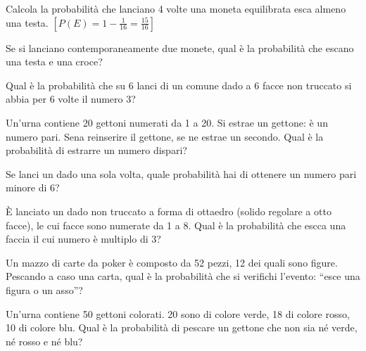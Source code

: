 \begin{esercizio}[\Ast]
 \label{ese:9.46}
Calcola la probabilità che lanciano 4 volte una moneta equilibrata esca almeno 
una testa.
\hfill $\left[P(E)=1-\frac 1{16}=\frac{15}{16}\right]$
\end{esercizio}


\begin{esercizio}%
Se si lanciano contemporaneamente due monete, qual è la probabilità che escano 
una testa e una croce?
\end{esercizio}

\begin{esercizio} %
Qual è la probabilità che su 6 lanci di un comune dado a 6 facce non truccato si 
abbia per 6 volte il numero 3?
\end{esercizio}

\begin{esercizio} %
Un'urna contiene 20 gettoni numerati da 1 a 20. Si estrae un gettone: è un 
numero pari. Sena reinserire il gettone, se ne estrae un secondo. Qual è la 
probabilità di estrarre un numero dispari?
\end{esercizio}

\begin{esercizio} %
Se lanci un dado una sola volta, quale probabilità hai di ottenere un numero 
pari minore di 6?
\end{esercizio}

\begin{esercizio} %
È lanciato un dado non truccato a forma di ottaedro (solido regolare a otto 
facce), le cui facce sono numerate da 1 a 8. Qual è la probabilità che escca una 
faccia il cui numero è multiplo di 3?
\end{esercizio}

\begin{esercizio} %
Un mazzo di carte da poker è composto da 52 pezzi, 12 dei quali sono figure. 
Pescando a caso una carta, qual è la probabilità che si verifichi l'evento: 
``esce una figura o un asso''?
\end{esercizio}

\begin{esercizio} %
Un'urna contiene 50 gettoni colorati. 20 sono di colore verde, 18 di colore 
rosso, 10 di colore blu. Qual è la probabilità di pescare un gettone che non sia 
né verde, né rosso e né blu?
\end{esercizio}

